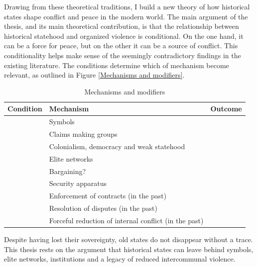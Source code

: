 
Drawing from these theoretical traditions, I build a new theory of how
historical states shape conflict and peace in the modern world. The main
argument of the thesis, and its main theoretical contribution, is that the
relationship between historical statehood and organized violence is conditional.
On the one hand, it can be a force for peace, but on the other it can be a
source of conflict. This conditionality helps make sense of the seemingly
contradictory findings in the existing literature. The conditions determine
which of mechanism become relevant, as outlined in Figure \ref{Mechanisms and
modifiers}.

\begin{table}[hpbt]
	\begin{tabularx}{\textwidth}{>{\centering\arraybackslash}X>{\centering\arraybackslash}X>{\centering\arraybackslash}X}
	\textbf{Condition} & \textbf{Mechanism} & \textbf{Outcome} \\
\toprule
	\multirow{4}{=}{\centering{Number and far from capital}} & Symbols & \multirow{4}{=}{\centering{Conflict}} \\
    	\cmidrule{2-2}
	& Claims making groups & \\
    	\cmidrule{2-2}
	& Colonialism, democracy and weak statehood & \\
	\cmidrule{2-2}
	& Elite networks & \\
\midrule
	\multirow{2}{=}{\centering{Near to capital}} &  Bargaining? & \multirow{5}{=}{\centering{Peace}} \\
	\cmidrule{2-2}
	& Security apparatus & \\
		\cmidrule{1-2}
	\multirow{3}{=}{\centering{Type of violence}} & Enforcement of contracts
						      (in the past) & \\
		\cmidrule{2-2}
	& Resolution of disputes (in the past) & \\
		\cmidrule{2-2}
	& Forceful reduction of internal conflict (in the past) & \\
	\bottomrule
\end{tabularx}
\caption{Mechanisms and modifiers}
\label{Mechanisms and modifiers}
\end{table}

Despite having lost their sovereignty, old states do not disappear without a
trace. This thesis rests on the argument that historical states can leave behind
symbols, elite networks, institutions and a legacy of reduced intercommunal
violence. 

